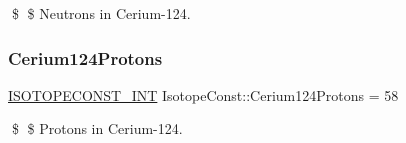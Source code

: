 \$ \$ Neutrons in Cerium-\/124. \mbox{\label{group___isotope_const-_cerium-_ce124_ga73ee227190e7244117f792ce7c617558}} 
\subsubsection{\texorpdfstring{Cerium124\+Protons}{Cerium124Protons}}
{\footnotesize\ttfamily \mbox{\hyperlink{group___isotope_const-_macros_ga5f18360b3e99483a35c32d789e62621c}{I\+S\+O\+T\+O\+P\+E\+C\+O\+N\+S\+T\+\_\+\+I\+NT}} Isotope\+Const\+::\+Cerium124\+Protons = 58}

\$ \$ Protons in Cerium-\/124. 